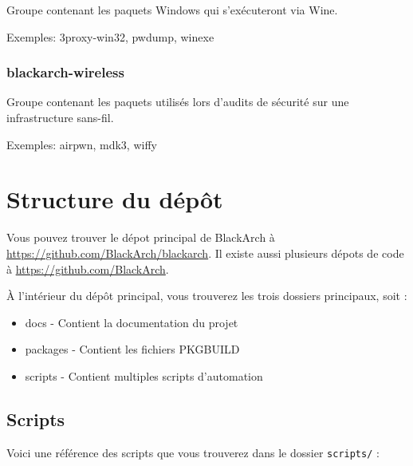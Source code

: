 \documentclass[a4paper, oneside, 11pt]{book}
\begin{document}
Groupe contenant les paquets Windows qui s'exécuteront via Wine.

Exemples: 3proxy-win32, pwdump, winexe

\subsubsection{blackarch-wireless}

Groupe contenant les paquets utilisés lors d'audits de sécurité sur une 
infrastructure sans-fil.

Exemples: airpwn, mdk3, wiffy

\section{Structure du dépôt}

Vous pouvez trouver le dépot principal de BlackArch à 
\href{https://github.com/BlackArch/blackarch}
{https://github.com/BlackArch/blackarch}. Il existe aussi plusieurs dépots de
code à \href{https://github.com/BlackArch}{https://github.com/BlackArch}.

À l'intérieur du dépôt principal, vous trouverez les trois dossiers principaux,
soit :

\begin{itemize}
\item docs - Contient la documentation du projet
\item packages - Contient les fichiers PKGBUILD
\item scripts - Contient multiples scripts d'automation
\end{itemize}

\subsection{Scripts}

Voici une référence des scripts que vous trouverez dans le dossier
\verb|scripts/| :
\end{document}
